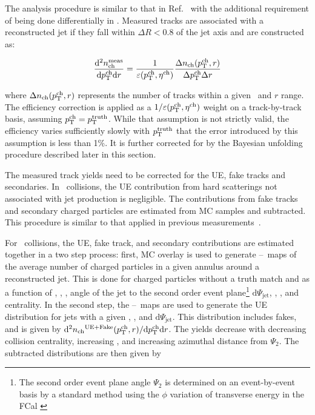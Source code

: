 
The analysis procedure is similar to that in Ref.~\cite{Aaboud:2018hpb} with the additional requirement of being done differentially in \rvar. Measured tracks are associated with a reconstructed jet if they fall within $\Delta R < 0.8$ of the jet axis and are constructed as:

\begin{align*}
\dfrac{\mathrm{d}^{2} \mbox{$n_{\mathrm{ch}}^{\mathrm{meas}}$} }{ \mathrm{d} \mbox{$p_{\mathrm{T}}^{\mathrm{ch}}$} \mathrm{d} r} = \frac{1}{\varepsilon(\mbox{$p_{\mathrm{T}}^{\mathrm{ch}}$},\mbox{$\eta^{\mathrm{ch}}$})} \frac{\Delta \mbox{$n_{\mathrm{ch}}$}( \mbox{$p_{\mathrm{T}}^{\mathrm{ch}}$}, r)}{ \Delta\mbox{$p_{\mathrm{T}}^{\mathrm{ch}}$} \Delta r}
\end{align*}

where $\Delta \mbox{$n_{\mathrm{ch}}$} (\mbox{$p_{\mathrm{T}}^{\mathrm{ch}}$}, r)$ represents the number of tracks within a given \pttrk\ and $r$ range. The efficiency correction is applied as a $1/\varepsilon(\mbox{$p_{\mathrm{T}}^{\mathrm{ch}}$},\mbox{$\eta^{\mathrm{ch}}$})$ weight on a track-by-track basis, assuming $\mbox{$p_{\mathrm{T}}^{\mathrm{ch}}$} = \mbox{$p_{\mathrm{T}}^{\mathrm{truth}}$}$. While that assumption is not strictly valid, the efficiency varies sufficiently slowly with $\mbox{$p_{\mathrm{T}}^{\mathrm{truth}}$}$ that the error
introduced by this assumption is less than 1\%. It is further corrected for by the Bayesian unfolding procedure described later in this section.

The measured track yields need to be corrected for the UE, fake tracks and secondaries. In \pp\ collisions, the UE contribution from hard scatterings not associated with jet production is negligible. The contributions from fake tracks and secondary charged particles are estimated from MC samples and subtracted. This procedure is similar to that applied in previous measurements~\cite{Aaboud:2017tke,Aaboud:2018hpb}.

For \pbpb\ collisions, the UE, fake track, and secondary contributions are estimated together in a two step process: first, MC overlay is used to generate \etajet--\phijet\ maps of the average number of charged particles in a given annulus around a reconstructed jet. This is done for charged particles without a truth match and as a function of \ptjet, \etajet, \phijet, angle of the jet to the second order event plane\footnote{The second order event plane angle $\Psi_2$ is determined on an event-by-event basis by a standard method using the $\phi$ variation of transverse energy in the FCal \cite{ATLAS:2012at}} $ \mathrm{d}\Psi_{\mathrm{jet}}$, \rvar, \pttrk, and centrality. In the second step, the \etajet--\phijet\ maps are used to generate the UE distribution for jets with a given \etajet, \phijet, and $\mathrm{d}\Psi_{\mathrm{jet}}$. This distribution includes fakes, and is given by \mbox{$\mathrm{d}^2 \mbox{$n_{\mathrm{ch}}$}^{\mathrm{UE+Fake}}(\mbox{$p_{\mathrm{T}}^{\mathrm{ch}}$}, r) / \mathrm{d} \mbox{$p_{\mathrm{T}}^{\mathrm{ch}}$} \mathrm{d} r$}. The yields decrease with decreasing collision centrality, increasing \pttrk, and increasing azimuthal distance from $\Psi_2$. The subtracted distributions are then given by 

